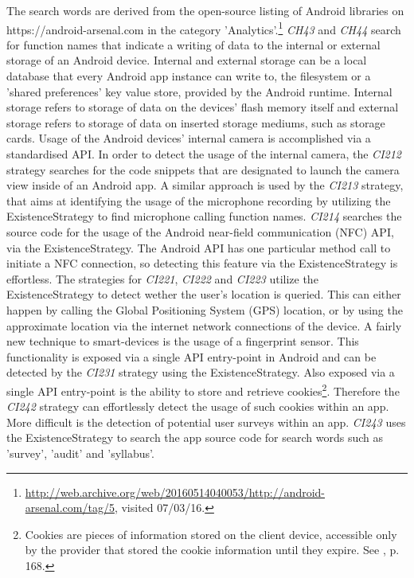 The search words are derived from the open-source listing of Android libraries on https://android-arsenal.com in the category 'Analytics'.\footnote{\url{http://web.archive.org/web/20160514040053/http://android-arsenal.com/tag/5}, visited 07/03/16.}
\textit{CH43} and \textit{CH44} search for function names that indicate a writing of data to the internal or external storage of an Android device.
Internal and external storage can be a local database that every Android app instance can write to, the filesystem or a 'shared preferences' key value store, provided by the Android runtime.
Internal storage refers to storage of data on the devices' flash memory itself and external storage refers to storage of data on inserted storage mediums, such as storage cards.
Usage of the Android devices' internal camera is accomplished via a standardised \acs{API}.
In order to detect the usage of the internal camera, the \textit{CI212} strategy searches for the code snippets that are designated to launch the camera view inside of an Android app.
A similar approach is used by the \textit{CI213} strategy, that aims at identifying the usage of the microphone recording by utilizing the ExistenceStrategy to find microphone calling function names.
\textit{CI214} searches the source code for the usage of the Android near-field communication (\acs{NFC}) API, via the ExistenceStrategy.
The Android API has one particular method call to initiate a NFC connection, so detecting this feature via the ExistenceStrategy is effortless.
The strategies for \textit{CI221}, \textit{CI222} and \textit{CI223} utilize the ExistenceStrategy to detect wether the user's location is queried.
This can either happen by calling the Global Positioning System (\acs{GPS}) location, or by using the approximate location via the internet network connections of the device.
A fairly new technique to smart-devices is the usage of a fingerprint sensor. 
This functionality is exposed via a single API entry-point in Android and can be detected by the \textit{CI231} strategy using the ExistenceStrategy.
Also exposed via a single API entry-point is the ability to store and retrieve cookies\footnote{Cookies are pieces of information stored on the client device, accessible only by the provider that stored the cookie information until they expire. See \cite{Laudon2010}, p. 168.}.
Therefore the \textit{CI242} strategy can effortlessly detect the usage of such cookies within an app.
More difficult is the detection of potential user surveys within an app.
\textit{CI243} uses the ExistenceStrategy to search the app source code for search words such as 'survey', 'audit' and 'syllabus'.

